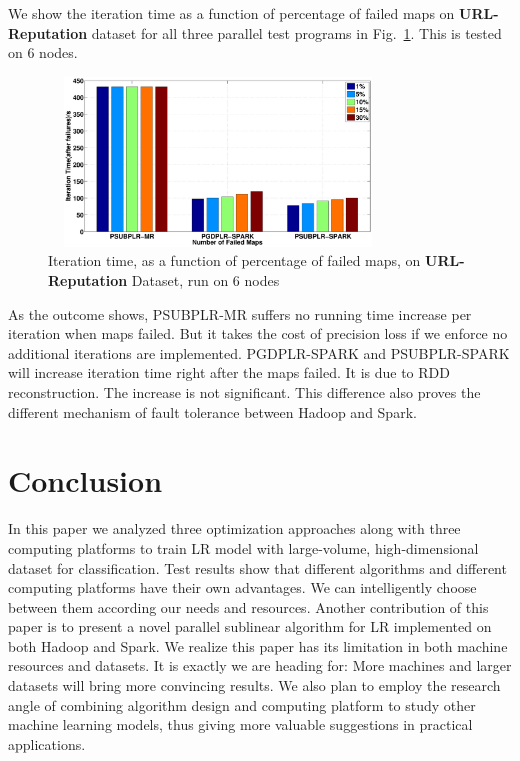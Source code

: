 \documentclass[10pt, conference, compsocconf]{IEEEtran}
\begin{document}
We show the iteration time as a function of percentage of failed maps on \textbf{URL-Reputation} dataset for all three parallel test programs in Fig.~\ref{fig:14}.
This is tested on 6 nodes.
\begin{figure}[tb] \label{fig:14}
\center \includegraphics[height=4.5cm,width=9cm]{img/fault_tolerance.eps}\vspace{-0.4cm}
\caption{Iteration time, as a function of percentage of failed maps, on \textbf{URL-Reputation} Dataset, run on 6 nodes}\vspace{-0.5cm}
\end{figure}
As the outcome shows, PSUBPLR-MR suffers no running time increase per iteration when maps failed. But it takes the cost of precision loss if we enforce no additional iterations are implemented.
PGDPLR-SPARK and PSUBPLR-SPARK will increase iteration time right after the maps failed. It is due to RDD reconstruction. The increase is not significant.
This difference also proves the different mechanism of fault tolerance between Hadoop and Spark.

\section{Conclusion} \label{sec:concl}
In this paper we analyzed three optimization approaches along with three computing platforms to train LR model with large-volume, high-dimensional dataset for classification.
Test results show that different algorithms and different computing platforms have their own advantages.
We can intelligently choose between them according our needs and resources.
Another contribution of this paper is to present a novel parallel sublinear algorithm for LR implemented on both Hadoop and Spark.
We realize this paper has its limitation in both machine resources and datasets.
It is exactly we are heading for: More machines and larger datasets will bring more convincing results.
We also plan to employ the research angle of combining algorithm design and computing platform to study other machine learning models, thus giving more valuable suggestions in practical applications.

\begin{small}


\end{small}
\end{document}
